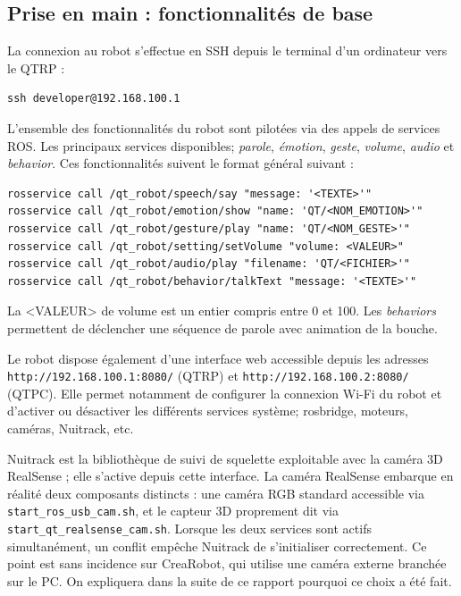 \documentclass[11pt]{article}
\begin{document}
\subsection{Prise en main : fonctionnalités de base}

La connexion au robot s'effectue en SSH depuis le terminal d'un ordinateur vers le QTRP :

\begin{verbatim}
ssh developer@192.168.100.1
\end{verbatim}

L'ensemble des fonctionnalités du robot sont pilotées via des appels de services ROS. Les principaux services disponibles; \textit{parole}, \textit{émotion}, \textit{geste}, \textit{volume}, \textit{audio} et \textit{behavior}. Ces fonctionnalités suivent le format général suivant :

\begin{verbatim}
rosservice call /qt_robot/speech/say "message: '<TEXTE>'"
rosservice call /qt_robot/emotion/show "name: 'QT/<NOM_EMOTION>'"
rosservice call /qt_robot/gesture/play "name: 'QT/<NOM_GESTE>'"
rosservice call /qt_robot/setting/setVolume "volume: <VALEUR>"
rosservice call /qt_robot/audio/play "filename: 'QT/<FICHIER>'"
rosservice call /qt_robot/behavior/talkText "message: '<TEXTE>'"
\end{verbatim}

La <VALEUR> de volume est un entier compris entre 0 et 100. Les \textit{behaviors} permettent de déclencher une séquence de parole avec animation de la bouche.

Le robot dispose également d'une interface web accessible depuis les adresses \texttt{http://192.168.100.1:8080/} (QTRP) et \texttt{http://192.168.100.2:8080/} (QTPC). Elle permet notamment de configurer la connexion Wi-Fi du robot et d'activer ou désactiver les différents services système; rosbridge, moteurs, caméras, Nuitrack, etc.

Nuitrack est la bibliothèque de suivi de squelette exploitable avec la caméra 3D RealSense ; elle s'active depuis cette interface. La caméra RealSense embarque en réalité deux composants distincts : une caméra RGB standard accessible via \texttt{start\_ros\_usb\_cam.sh}, et le capteur 3D proprement dit via \texttt{start\_qt\_realsense\_cam.sh}. Lorsque les deux services sont actifs simultanément, un conflit empêche Nuitrack de s'initialiser correctement. Ce point est sans incidence sur CreaRobot, qui utilise une caméra externe branchée sur le PC. On expliquera dans la suite de ce rapport pourquoi ce choix a été fait.
\end{document}
